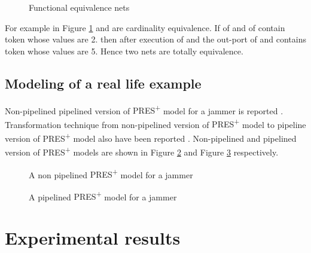 \documentclass[9pt,executive]{article}
\def\presp{PRES\textsuperscript{+}}
\def\presp{PRES\textsuperscript{+}}
\begin{document}
 \begin{figure}[htbp]
\centerline{}
\caption{Functional equivalence nets}
\label{fig:t}
\end{figure}
 For example in Figure \ref{fig:t}  and  are cardinality equivalence. If  of  and  of  contain token whose values are 2.
then after execution of  and  the out-port of  and  contains token whose values are 5. Hence two nets are totally equivalence.


\subsection{Modeling of a real life example}
Non-pipelined pipelined version of {\presp} model for a jammer is reported \cite{zebo}. Transformation technique from non-pipelined version of {\presp} model 
to pipeline version of {\presp} model also have been reported \cite{zebo}.
Non-pipelined and pipelined version of {\presp} models are shown in  Figure \ref{fig:nonp} and Figure \ref{fig:papline} respectively.

 \begin{figure}[htbp]
\centerline{}
\caption{A non pipelined {\presp} model for a jammer}
\label{fig:nonp}
\end{figure}
\clearpage
\begin{figure}[htbp]
\centerline{}
\caption{A pipelined {\presp} model for a jammer}
\label{fig:papline}
\end{figure}
\section{Experimental results}\label{results}
\end{document}
